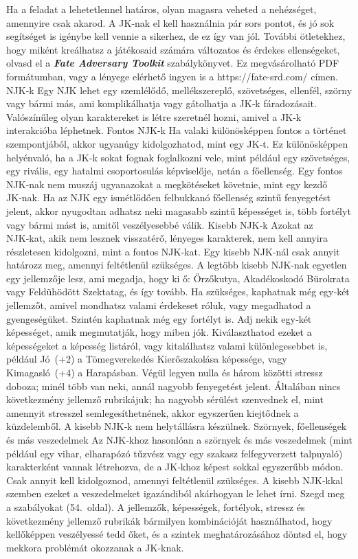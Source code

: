 \documentclass[oneside]{book}
\newcommand{\fate}[1]{\textbf{\textit{#1}}}
\newcommand{\page}[1]{#1.~oldal}
\begin{document}
Ha a feladat a lehetetlennel határos, olyan magasra veheted a nehézséget, amennyire csak akarod. A JK‑nak el kell használnia pár sors pontot, és jó sok segítséget is igénybe kell vennie a sikerhez, de ez így van jól.
További ötletekhez, hogy miként kreálhatsz a játékosaid számára változatos és érdekes ellenségeket, olvasd el a \fate{Fate Adversary Toolkit} szabálykönyvet. Ez megvásárolható PDF formátumban, vagy a lényege elérhető ingyen is a https://fate-srd.com/ címen.
NJK‑k
Egy NJK lehet egy szemlélődő, mellékszereplő, szövetséges, ellenfél, szörny vagy bármi más, ami komplikálhatja vagy gátolhatja a JK‑k fáradozásait. Valószínűleg olyan karaktereket is létre szeretnél hozni, amivel a JK‑k interakcióba léphetnek.
Fontos NJK‑k
Ha valaki különösképpen fontos a történet szempontjából, akkor ugyanúgy kidolgozhatod, mint egy JK‑t. Ez különösképpen helyénvaló, ha a JK‑k sokat fognak foglalkozni vele, mint például egy szövetséges, egy rivális, egy hatalmi csoportosulás képviselője, netán a főellenség.
Egy fontos NJK‑nak nem muszáj ugyanazokat a megkötéseket követnie, mint egy kezdő JK‑nak. Ha az NJK egy ismétlődően felbukkanó főellenség szintű fenyegetést jelent, akkor nyugodtan adhatsz neki magasabb szintű képességet is, több fortélyt vagy bármi mást is, amitől veszélyesebbé válik.
Kisebb NJK‑k
Azokat az NJK‑kat, akik nem lesznek visszatérő, lényeges karakterek, nem kell annyira részletesen kidolgozni, mint a fontos NJK‑kat. Egy kisebb NJK‑nál csak annyit határozz meg, amennyi feltétlenül szükséges.
A legtöbb kisebb NJK‑nak egyetlen egy jellemzője lesz, ami megadja, hogy ki ő: Őrzőkutya, Akadékoskodó Bürokrata vagy Feldühödött Szektatag, és így tovább.
Ha szükséges, kaphatnak még egy‑két jellemzőt, amivel mondhatsz valami érdekeset róluk, vagy megadhatod a gyengeségüket. Szintén kaphatnak még egy fortélyt is.
Adj nekik egy‑két képességet, amik megmutatják, hogy miben jók. Kiválaszthatod ezeket a képességeket a képesség listáról, vagy kitalálhatsz valami különlegesebbet is, például Jó~(+2) a Tömegverekedés Kierőszakolása képessége, vagy Kimagasló~(+4) a Harapásban.
Végül legyen nulla és három közötti stressz doboza; minél több van neki, annál nagyobb fenyegetést jelent. Általában nincs következmény jellemző rubrikájuk; ha nagyobb sérülést szenvednek el, mint amennyit stresszel semlegesíthetnének, akkor egyszerűen kiejtődnek a küzdelemből. A kisebb NJK‑k nem helytállásra készülnek.
Szörnyek, főellenségek és más veszedelmek
Az NJK‑khoz hasonlóan a szörnyek és más veszedelmek (mint például egy vihar, elharapózó tűzvész vagy egy szakasz felfegyverzett talpnyaló) karakterként vannak létrehozva, de a JK‑khoz képest sokkal egyszerűbb módon. Csak annyit kell kidolgoznod, amennyi feltétlenül szükséges. A kisebb NJK‑kkal szemben ezeket a veszedelmeket igazándiból akárhogyan le lehet írni. Szegd meg a szabályokat (\page{54}). A jellemzők, képességek, fortélyok, stressz és következmény jellemző rubrikák bármilyen kombinációját használhatod, hogy kellőképpen veszélyessé tedd őket, és a szintek meghatározásához döntsd el, hogy mekkora problémát okozzanak a JK‑knak.
\end{document}
